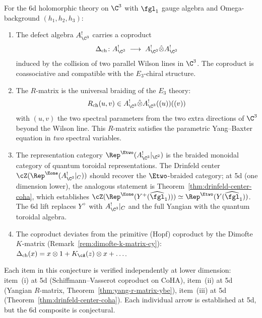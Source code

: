 \begin{conjecture}
\label{conj:chiral-qg-c3}
\ClaimStatusConjectured
For the 6d holomorphic theory on $\C^3$ with $\fgl_1$ gauge algebra and Omega-background $(h_1, h_2, h_3)$:
\begin{enumerate}[label=\textup{(\roman*)}]
 \item The defect algebra $A^!_{\C^3}$ carries a coproduct
 \[
 \Delta_{\mathrm{ch}} \colon A^!_{\C^3} \;\longrightarrow\; A^!_{\C^3} \hat{\otimes} A^!_{\C^3}
 \]
 induced by the collision of two parallel Wilson lines in $\C^3$. The coproduct is coassociative and compatible with the $E_3$-chiral structure.
 \item The $R$-matrix is the universal braiding of the $E_3$ theory:
 \[
 R_{\mathrm{ch}}(u, v) \in A^!_{\C^3} \hat{\otimes} A^!_{\C^3}((u))((v))
 \]
 with $(u, v)$ the two spectral parameters from the two extra directions of $\C^3$ beyond the Wilson line. This $R$-matrix satisfies the parametric Yang--Baxter equation in \emph{two} spectral variables.
 \item The representation category $\Rep^{\Etwo}(A^!_{\C^3}|_{\C^2})$ is the braided monoidal category of quantum toroidal representations. The Drinfeld center $\cZ(\Rep^{\Eone}(A^!_{\C^3}|_C))$ should recover the $\Etwo$-braided category; at 5d (one dimension lower), the analogous statement is Theorem~\ref{thm:drinfeld-center-coha}, which establishes $\cZ(\Rep^{\Eone}(Y^+(\widehat{\fgl}_1))) \simeq \Rep^{\Etwo}(Y(\widehat{\fgl}_1))$. The 6d lift replaces $Y^+$ with $A^!_{\C^3}|_C$ and the full Yangian with the quantum toroidal algebra.
 \item The coproduct deviates from the primitive (Hopf) coproduct by the Dimofte $K$-matrix (Remark~\ref{rem:dimofte-k-matrix-cy}): $\Delta_{\mathrm{ch}}(x) = x \otimes 1 + K_{\cA}(z) \otimes x + \ldots$.
\end{enumerate}
Each item in this conjecture is verified independently at lower dimension: item~(i) at 5d (Schiffmann--Vasserot coproduct on CoHA), item~(ii) at 5d (Yangian $R$-matrix, Theorem~\ref{thm:yang-r-matrix-ybe}), item~(iii) at 5d (Theorem~\ref{thm:drinfeld-center-coha}). Each individual arrow is established at 5d, but the 6d composite is conjectural.
\end{conjecture}

